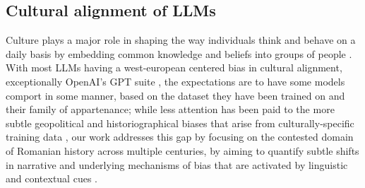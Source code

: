 \documentclass[11pt]{article}
\begin{document}
\subsection{Cultural alignment of LLMs}
Culture plays a major role in shaping the way individuals think and behave on a daily basis \cite{oyserman2008} by embedding common knowledge and beliefs into groups of people \cite{hofstede2001}. With most LLMs having a west-european centered bias in cultural alignment, exceptionally OpenAI's GPT suite \cite{tao2024}, the expectations are to have some models comport in some manner, based on the dataset they have been trained on and their family of appartenance; while less attention has been paid to the more subtle geopolitical and historiographical biases that arise from culturally-specific training data \cite{hauser2024}, our work addresses this gap by focusing on the contested domain of Romanian history across multiple centuries, by aiming to quantify subtle shifts in narrative and underlying mechanisms of bias that are activated by linguistic and contextual cues \cite{bhatia2024}.
\end{document}
